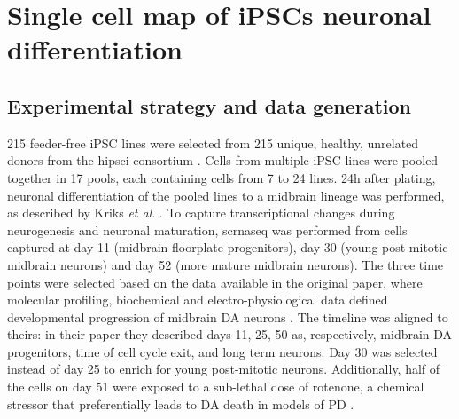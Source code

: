 


\newpage

\section{Single cell map of iPSCs neuronal differentiation}
\label{sec:neuroseq_overview}

\subsection{Experimental strategy and data generation}

215 feeder-free iPSC lines 
were selected
from 215 unique, healthy, unrelated donors from the \gls{hipsci} consortium \cite{kilpinen2017common}.
Cells from multiple iPSC lines were pooled together in 17 pools, each containing cells from 7 to 24 lines.
24h after plating, neuronal differentiation of the pooled lines to a midbrain lineage was performed, as described by Kriks \textit{et al}. \cite{kriks2011dopamine}. 
To capture transcriptional changes during neurogenesis and neuronal maturation, 
\gls{scrnaseq} 
was performed
from cells captured at day 11 (midbrain floorplate progenitors), day 30 (young post-mitotic midbrain neurons) and day 52 (more mature midbrain neurons). 
The
three time points 
were selected based on the data available in the original paper, where molecular profiling, biochemical and electro-physiological data defined developmental progression of midbrain DA neurons \cite{kriks2011dopamine}. 
The timeline was aligned to theirs:
in their paper they described days 11, 25, 50
as, respectively, midbrain DA progenitors, time of cell cycle exit, 
and
long term neurons.
Day 30 was selected instead of day 25 to enrich for young post-mitotic neurons. 
Additionally, 
half of the cells on day 51 
were exposed
to a sub-lethal dose of rotenone, a chemical stressor that preferentially leads to DA death in models of PD \cite{xiong2012mitochondrial}.

